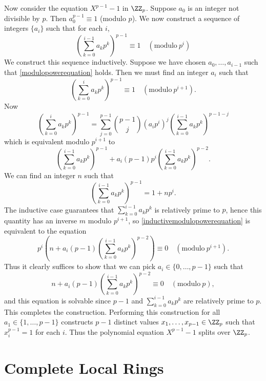     Now consider the equation $X^{p-1} - 1$ in $\ZZ_p$. Suppose $a_0$ is an integer not divisible by $p$. Then $a_0^{p-1} \equiv 1$ (modulo $p$). We now construct a sequence of integers $\{ a_i \}$ such that for each $i$,
    \begin{equation} \label{modulopowerequation}
        \left( \sum_{k = 0}^{i-1} a_k p^k \right)^{p-1} \equiv 1 \quad(\text{modulo}\ p^i)
    \end{equation}
    We construct this sequence inductively. Suppose we have chosen $a_0,\dots, a_{i-1}$ such that \eqref{modulopowerequation} holds. Then we must find an integer $a_i$ such that
    \begin{equation} \label{inductivemodulopowerequation}
        \left( \sum_{k = 0}^i a_k p^k \right)^{p-1} \equiv 1 \quad(\text{modulo}\ p^{i+1}).
    \end{equation}
    Now
    \[ \left( \sum_{k = 0}^i a_k p^k \right)^{p-1} = \sum_{j = 0}^{p-1} \binom{p-1}{j} \left( a_ip^i \right)^j \left( \sum_{k = 0}^{i-1} a_k p^k \right)^{p-1-j} \]
    which is equivalent modulo $p^{i+1}$ to
    \[ \left( \sum_{k = 0}^{i-1} a_k p^k \right)^{p-1} + a_i (p-1)p^i \left( \sum_{k = 0}^{i-1} a_k p^k \right)^{p-2}. \]
    We can find an integer $n$ such that
    \[ \left( \sum_{k = 0}^{i-1} a_k p^k \right)^{p-1} = 1 + np^i. \]
    The inductive case guarantees that $\sum_{k = 0}^{i-1} a_k p^k$ is relatively prime to $p$, hence this quantity has an inverse $m$ modulo $p^{i+1}$, so \eqref{inductivemodulopowerequation} is equivalent to the equation
    \[ p^i \left(n + a_i (p-1) \left( \sum_{k = 0}^{i-1} a_k p^k \right)^{p-2} \right) \equiv 0 \quad(\text{modulo}\ p^{i+1}). \]
    Thus it clearly suffices to show that we can pick $a_i \in \{ 0, \dots, p-1 \}$ such that
    \[ n + a_i (p-1) \left( \sum_{k = 0}^{i-1} a_k p^k \right)^{p-2} \equiv 0 \quad(\text{modulo}\ p), \]
    and this equation is solvable since $p-1$ and $\sum_{k = 0}^{i-1} a_k p^k$ are relatively prime to $p$. This completes the construction. Performing this construction for all $a_1 \in \{ 1, \dots, p-1 \}$ constructs $p-1$ distinct values $x_1, \dots, x_{p-1} \in \ZZ_p$ such that $x_i^{p-1} = 1$ for each $i$. Thus the polynomial equation $X^{p-1} - 1$ splits over $\ZZ_p$.

\section{Complete Local Rings}

